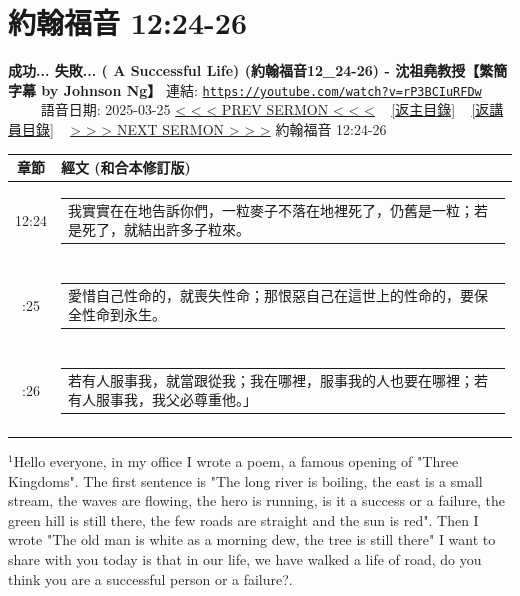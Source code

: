 \documentclass{book}
\begin{document}
\section{約翰福音 12:24-26}
\label{sec:rP3BCIuRFDw}
\textbf{成功... 失敗... ( A Successful Life) (約翰福音12\_24-26) - 沈祖堯教授【繁簡字幕 by Johnson Ng】}
\newline
\newline
連結: \href{https://youtube.com/watch?v=rP3BCIuRFDw}{\texttt{https://youtube.com/watch?v=rP3BCIuRFDw}} ~~~~ 語音日期: 2025-03-25
\newline
\newline
\hyperref[sec:fJrsPMmDHtU]{< < < PREV SERMON < < <}
~
\hyperlink{toc}{[返主目錄]}
~
\hyperref[ch:preacher7]{[返講員目錄]}
~
\hyperref[sec:toZa1ewaUWE]{> > > NEXT SERMON > > >}
\newline
\newline
約翰福音 12:24-26
\newline
\begin{longtable}{cl}
\hline
\hline
章節 & 經文 (和合本修訂版)\\
\hline
12:24 & \begin{tabularx}{0.7\textwidth}{X} 我實實在在地告訴你們，一粒麥子不落在地裡死了，仍舊是一粒；若是死了，就結出許多子粒來。 \end{tabularx} \\ \\ \relax
12:25 & \begin{tabularx}{0.7\textwidth}{X} 愛惜自己性命的，就喪失性命；那恨惡自己在這世上的性命的，要保全性命到永生。 \end{tabularx} \\ \\ \relax
12:26 & \begin{tabularx}{0.7\textwidth}{X} 若有人服事我，就當跟從我；我在哪裡，服事我的人也要在哪裡；若有人服事我，我父必尊重他。」 \end{tabularx} \\ \\
[1ex]
\hline
\hline
\end{longtable}
$^{1}$Hello everyone, in my office I wrote a poem, a famous opening of "Three Kingdoms".
The first sentence is "The long river is boiling, the east is a small stream, the waves are flowing, the hero is running, is it a success or a failure, the green hill is still there, the few roads are straight and the sun is red".
Then I wrote "The old man is white as a morning dew, the tree is still there" I want to share with you today is that in our life, we have walked a life of road, do you think you are a successful person or a failure?.
\end{document}

